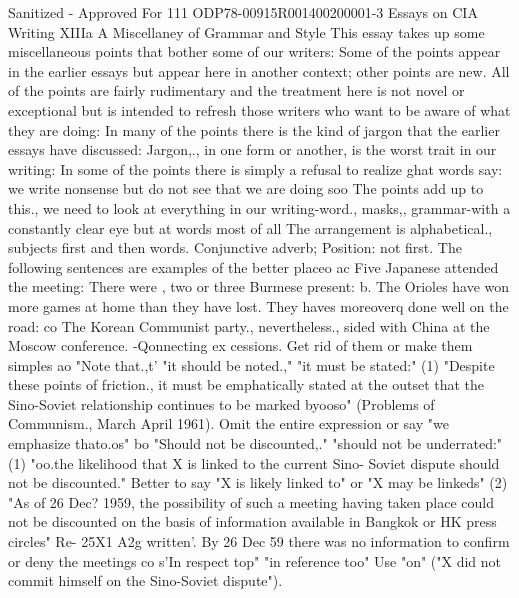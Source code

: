 \documentclass[
    oneside,
    11pt,
    draft
]{memoir}
\begin{document}
Sanitized - Approved For 111 ODP78-00915R001400200001-3 Essays on CIA Writing XIIIa A Miscellaney of Grammar and Style This essay takes up some miscellaneous points that bother some of our writers: Some of the points appear in the earlier essays but appear here in another context; other points are new. All of the points are fairly rudimentary and the treatment here is not novel or exceptional but is intended to refresh those writers who want to be aware of what they are doing: In many of the points there is the kind of jargon that the earlier essays have discussed: Jargon,., in one form or another, is the worst trait in our writing: In some of the points there is simply a refusal to realize ghat words say: we write nonsense but do not see that we are doing soo The points add up to this., we need to look at everything in our writing-word., masks,, grammar-with a constantly clear eye but at words most of all The arrangement is alphabetical., subjects first and then words. Conjunctive adverb; Position: not first. The following sentences are examples of the better placeo ac Five Japanese attended the meeting: There were , two or three Burmese present: b. The Orioles have won more games at home than they have lost. They haves moreoverq done well on the road: co The Korean Communist party., nevertheless., sided with China at the Moscow conference. -Qonnecting ex cessions. Get rid of them or make them simples ao "Note that.,t' "it should be noted.," "it must be stated:" (1) "Despite these points of friction., it must be emphatically stated at the outset that the Sino-Soviet relationship continues to be marked byooso" (Problems of Communism., March April 1961). Omit the entire expression or say "we emphasize thato.os" bo "Should not be discounted,." "should not be underrated:" (1) "oo.the likelihood that X is linked to the current Sino- Soviet dispute should not be discounted." Better to say "X is likely linked to" or "X may be linkeds" (2) "As of 26 Dec? 1959, the possibility of such a meeting having taken place could not be discounted on the basis of information available in Bangkok or HK press circles" Re- 25X1 A2g written'. By 26 Dec 59 there was no information to confirm or deny the meetings co s'In respect top" "in reference too" Use "on" ("X did not commit himself on the Sino-Soviet dispute").
\end{document}
